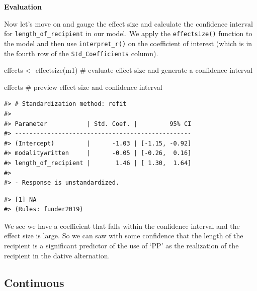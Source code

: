 \documentclass[
  letterpaper,
]{latex/krantz}
\newenvironment{Shaded}{\begin{snugshade}}{\end{snugshade}}
\newcommand{\CommentTok}[1]{\textcolor[rgb]{0.37,0.37,0.37}{#1}}
\newcommand{\DecValTok}[1]{\textcolor[rgb]{0.68,0.00,0.00}{#1}}
\newcommand{\FunctionTok}[1]{\textcolor[rgb]{0.28,0.35,0.67}{#1}}
\newcommand{\NormalTok}[1]{\textcolor[rgb]{0.00,0.23,0.31}{#1}}
\newcommand{\OtherTok}[1]{\textcolor[rgb]{0.00,0.23,0.31}{#1}}
\newcommand{\SpecialCharTok}[1]{\textcolor[rgb]{0.37,0.37,0.37}{#1}}
\begin{document}
\textbf{Evaluation}

Now let's move on and gauge the effect size and calculate the confidence
interval for \texttt{length\_of\_recipient} in our model. We apply the
\texttt{effectsize()} function to the model and then use
\texttt{interpret\_r()} on the coefficient of interest (which is in the
fourth row of the \texttt{Std\_Coefficients} column).

\begin{Shaded}
\begin{Highlighting}[]
\NormalTok{effects }\OtherTok{\textless{}{-}} \FunctionTok{effectsize}\NormalTok{(m1) }\CommentTok{\# evaluate effect size and generate a confidence interval}

\NormalTok{effects }\CommentTok{\# preview effect size and confidence interval}
\end{Highlighting}
\end{Shaded}

\begin{verbatim}
#> # Standardization method: refit
#> 
#> Parameter           | Std. Coef. |         95% CI
#> -------------------------------------------------
#> (Intercept)         |      -1.03 | [-1.15, -0.92]
#> modalitywritten     |      -0.05 | [-0.26,  0.16]
#> length_of_recipient |       1.46 | [ 1.30,  1.64]
#> 
#> - Response is unstandardized.
\end{verbatim}

\begin{Shaded}
\end{Shaded}

\begin{verbatim}
#> [1] NA
#> (Rules: funder2019)
\end{verbatim}

We see we have a coefficient that falls within the confidence interval
and the effect size is large. So we can saw with some confidence that
the length of the recipient is a significant predictor of the use of
`PP' as the realization of the recipient in the dative alternation.

\hypertarget{continuous-2}{%
\subsection{Continuous}\label{continuous-2}}
\end{document}
